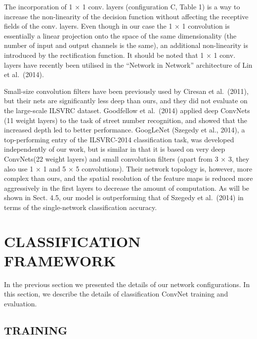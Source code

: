 \documentclass[12pt,a4paper,UTF8,twoside]{book}
\begin{document}
The incorporation of 1 × 1 conv. layers (configuration C, Table 1) is a way to increase the non-linearity of the decision function without affecting the receptive fields of the conv. layers. Even though in our case the 1 × 1 convolution is essentially a linear projection onto the space of the same dimensionality (the number of input and output channels is the same), an additional non-linearity is introduced by the rectification function. It should be noted that 1 × 1 conv. layers have recently been utilised in the ``Network in Network'' architecture of Lin et al.~(2014).

Small-size convolution filters have been previously used by Ciresan et al.~(2011), but their nets are significantly less deep than ours, and they did not evaluate on the large-scale ILSVRC dataset. Goodfellow et al.~(2014) applied deep ConvNets (11 weight layers) to the task of street number recognition, and showed that the increased depth led to better performance. GoogLeNet (Szegedy et al., 2014), a top-performing entry of the ILSVRC-2014 classification task, was developed independently of our work, but is similar in that it is based on very deep ConvNets(22 weight layers) and small convolution filters (apart from 3 × 3, they also use 1 × 1 and 5 × 5 convolutions). Their network topology is, however, more complex than ours, and the spatial resolution of the feature maps is reduced more aggressively in the first layers to decrease the amount of computation. As will be shown in Sect. 4.5, our model is outperforming that of Szegedy et al.~(2014) in terms of the single-network classification accuracy.

\hypertarget{classification-framework}{%
\section{CLASSIFICATION FRAMEWORK}\label{classification-framework}}

In the previous section we presented the details of our network configurations. In this section, we describe the details of classification ConvNet training and evaluation.

\hypertarget{training}{%
\subsection{TRAINING}\label{training}}


\backmatter
\end{document}
